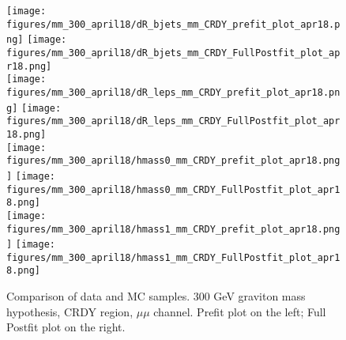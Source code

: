 \begin{figure}[H]
\begin{center}
\texttt{[image: figures/mm\_300\_april18/dR\_bjets\_mm\_CRDY\_prefit\_plot\_apr18.png]}
\texttt{[image: figures/mm\_300\_april18/dR\_bjets\_mm\_CRDY\_FullPostfit\_plot\_apr18.png]}\\
\texttt{[image: figures/mm\_300\_april18/dR\_leps\_mm\_CRDY\_prefit\_plot\_apr18.png]}
\texttt{[image: figures/mm\_300\_april18/dR\_leps\_mm\_CRDY\_FullPostfit\_plot\_apr18.png]}\\
\texttt{[image: figures/mm\_300\_april18/hmass0\_mm\_CRDY\_prefit\_plot\_apr18.png]}
\texttt{[image: figures/mm\_300\_april18/hmass0\_mm\_CRDY\_FullPostfit\_plot\_apr18.png]}\\
\texttt{[image: figures/mm\_300\_april18/hmass1\_mm\_CRDY\_prefit\_plot\_apr18.png]}
\texttt{[image: figures/mm\_300\_april18/hmass1\_mm\_CRDY\_FullPostfit\_plot\_apr18.png]}\\
\caption[Data-MC comparison in CRDY.]{Comparison of data and MC samples. 300 GeV graviton mass hypothesis, CRDY region, $\mu\mu$ channel. Prefit plot on the left; Full Postfit plot on the right.}
\label{MCcomparisons_mm_low_CRDY}
\end{center}
\end{figure}

